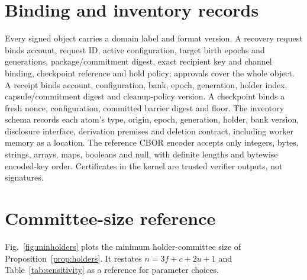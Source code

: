 \documentclass[pdflatex,sn-mathphys-num,twocolumn]{sn-jnl}
\theoremstyle{plain}
\theoremstyle{definition}
\begin{document}
\begin{appendices}
\section{Binding and inventory records}\label{app:binding}
Every signed object carries a domain label and format version. A recovery request binds account, request ID, active configuration, target birth epochs and generations, package/commitment digest, exact recipient key and channel binding, checkpoint reference and hold policy; approvals cover the whole object. A receipt binds account, configuration, bank, epoch, generation, holder index, capsule/commitment digest and cleanup-policy version. A checkpoint binds a fresh nonce, configuration, committed barrier digest and floor. The inventory schema records each atom's type, origin, epoch, generation, holder, bank version, disclosure interface, derivation premises and deletion contract, including worker memory as a location. The reference CBOR encoder accepts only integers, bytes, strings, arrays, maps, booleans and null, with definite lengths and bytewise encoded-key order. Certificates in the kernel are trusted verifier outputs, not signatures.

\section{Committee-size reference}\label{app:params}
Fig.~\ref{fig:minholders} plots the minimum holder-committee size of Proposition~\ref{prop:holders}. It restates $n=3f+c+2u+1$ and Table~\ref{tab:sensitivity} as a reference for parameter choices.

\end{appendices}


\end{document}
